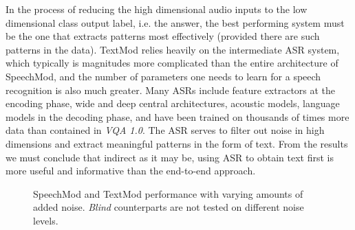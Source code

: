 \documentclass[letterpaper]{article} %
\begin{document}
In the process of reducing the high dimensional audio inputs to the low dimensional class output label, i.e. the answer, the best performing system must be the one that extracts patterns most effectively (provided there are such patterns in the data). TextMod relies heavily on the intermediate ASR system, which typically is magnitudes more complicated than the entire architecture of SpeechMod, and the number of parameters one needs to learn for a speech recognition is also much greater. Many ASRs include feature extractors at the encoding phase, wide and deep central architectures, acoustic models, language models in the decoding phase, and have been trained on thousands of times more data than contained in \textit{VQA 1.0}. The ASR serves to filter out noise in high dimensions and extract meaningful patterns in the form of text. From the results we must conclude that indirect as it may be, using ASR to obtain text first is more useful and informative than the end-to-end approach.


\pgfplotsset{width=8cm,compat=1.9}
\begin{figure}[t]
\centering
{}
\caption{SpeechMod and TextMod performance with varying amounts of added noise. \textit{Blind} counterparts are not tested on different noise levels.}
\label{fig:noiseplots}
\end{figure}
\end{document}
